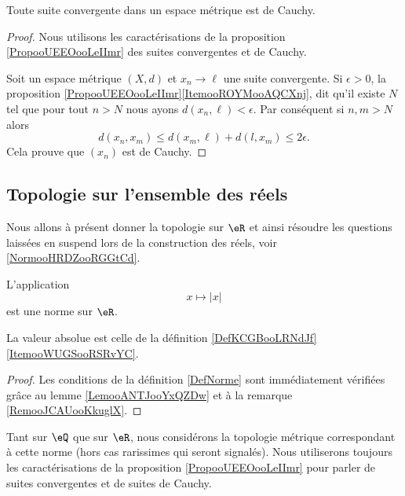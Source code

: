 \begin{proposition}
    Toute suite convergente dans un espace métrique est de Cauchy.
\end{proposition}

\begin{proof}
    Nous utilisons les caractérisations de la proposition \ref{PropooUEEOooLeIImr} des suites convergentes et de Cauchy.

    Soit un espace métrique \( (X,d)\) et \( x_n\to\ell\) une suite convergente. Si \( \epsilon>0\), la proposition \ref{PropooUEEOooLeIImr}\ref{ItemooROYMooAQCXnj}, dit qu'il existe \( N\) tel que pour tout \( n>N\) nous ayons \( d(x_n,\ell)<\epsilon\). Par conséquent si \( n,m>N\) alors
    \begin{equation}
        d(x_n,x_m)\leq d(x_m,\ell)+d(l,x_m)\leq 2\epsilon.
    \end{equation}
    Cela prouve que \( (x_n)\) est de Cauchy.
\end{proof}

\subsection{Topologie sur l'ensemble des réels}
\label{sebsecooGKHYooMwHQaD}

Nous allons à présent donner la topologie sur \( \eR\) et ainsi résoudre les questions laissées en suspend lors de la construction des réels, voir \ref{NormooHRDZooRGGtCd}.

\begin{lemma}
    L'application 
    \begin{equation}
         x\mapsto | x |
    \end{equation}
     est une norme sur $\eR$.
\end{lemma}
La valeur absolue est celle de la définition \ref{DefKCGBooLRNdJf}\ref{ItemooWUGSooRSRvYC}.

\begin{proof}
    Les conditions de la définition \ref{DefNorme} sont immédiatement vérifiées grâce au lemme \ref{LemooANTJooYxQZDw} et à la remarque \ref{RemooJCAUooKkuglX}.
\end{proof}

\begin{normaltext}      \label{ooLCMFooQjMaxV}
Tant sur \( \eQ\) que sur \( \eR\), nous considérons la topologie métrique correspondant à cette norme (hors cas rarissimes qui seront signalés). Nous utiliserons toujours les caractérisations de la proposition \ref{PropooUEEOooLeIImr} pour parler de suites convergentes et de suites de Cauchy.
\end{normaltext}


